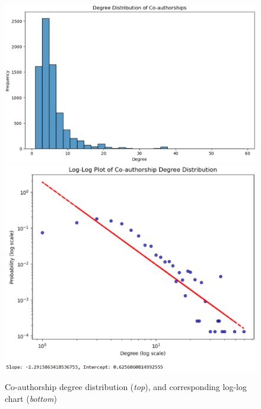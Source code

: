 \documentclass[a4paper, review, endfloat, authoryear]{elsarticle}
\begin{document}
	\begin{figure}[htbp]
		\centering
		\includegraphics[height=0.2\textheight, keepaspectratio]{pics/coauthorship_degree_distribution.eps}
		\includegraphics[height=0.2\textheight, keepaspectratio]{pics/coauthorship_degree_distribution_loglog_chart.eps}
		\caption{Co-authorship degree distribution (\textit{top}), and corresponding log-log chart (\textit{bottom})}\label{fig:fig3}
	\end{figure}
	
\end{document}
